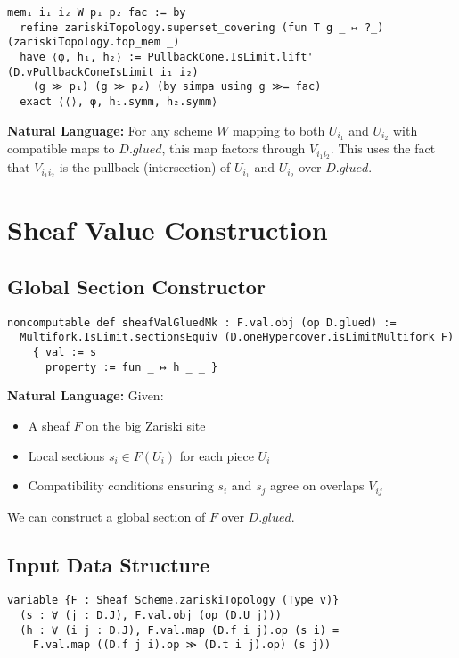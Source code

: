 \documentclass{article}
\theoremstyle{definition}
\begin{document}
\begin{lstlisting}
mem₁ i₁ i₂ W p₁ p₂ fac := by
  refine zariskiTopology.superset_covering (fun T g _ ↦ ?_) (zariskiTopology.top_mem _)
  have ⟨φ, h₁, h₂⟩ := PullbackCone.IsLimit.lift' (D.vPullbackConeIsLimit i₁ i₂)
    (g ≫ p₁) (g ≫ p₂) (by simpa using g ≫= fac)
  exact ⟨⟨⟩, φ, h₁.symm, h₂.symm⟩
\end{lstlisting}

\textbf{Natural Language:} For any scheme $W$ mapping to both $U_{i_1}$ and $U_{i_2}$ with compatible maps to $D.glued$, this map factors through $V_{i_1 i_2}$. This uses the fact that $V_{i_1 i_2}$ is the pullback (intersection) of $U_{i_1}$ and $U_{i_2}$ over $D.glued$.

\section{Sheaf Value Construction}

\subsection{Global Section Constructor}

\begin{lstlisting}
noncomputable def sheafValGluedMk : F.val.obj (op D.glued) :=
  Multifork.IsLimit.sectionsEquiv (D.oneHypercover.isLimitMultifork F)
    { val := s
      property := fun _ ↦ h _ _ }
\end{lstlisting}

\textbf{Natural Language:} Given:
\begin{itemize}
\item A sheaf $F$ on the big Zariski site
\item Local sections $s_i \in F(U_i)$ for each piece $U_i$
\item Compatibility conditions ensuring $s_i$ and $s_j$ agree on overlaps $V_{ij}$
\end{itemize}
We can construct a global section of $F$ over $D.glued$.

\subsection{Input Data Structure}

\begin{lstlisting}
variable {F : Sheaf Scheme.zariskiTopology (Type v)}
  (s : ∀ (j : D.J), F.val.obj (op (D.U j)))
  (h : ∀ (i j : D.J), F.val.map (D.f i j).op (s i) =
    F.val.map ((D.f j i).op ≫ (D.t i j).op) (s j))
\end{lstlisting}
\end{document}
